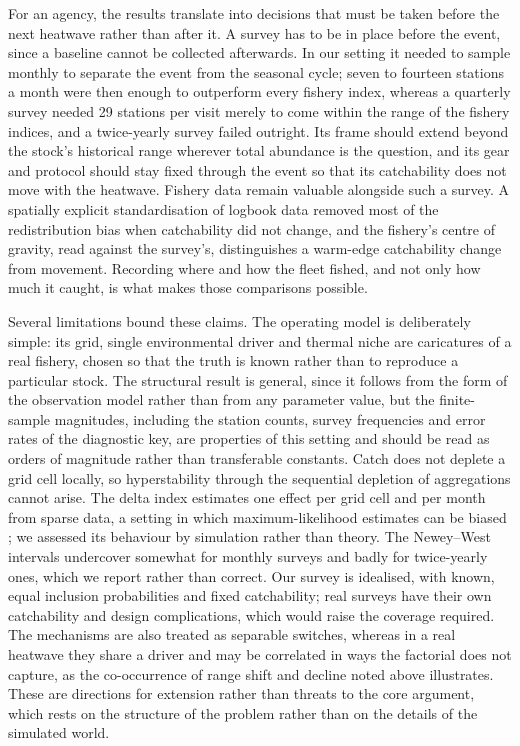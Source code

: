 \documentclass[11pt,a4paper]{article}
\begin{document}
For an agency, the results translate into decisions that must be taken before the next heatwave rather than after it. A survey has to be in place before the event, since a baseline cannot be collected afterwards. In our setting it needed to sample monthly to separate the event from the seasonal cycle; seven to fourteen stations a month were then enough to outperform every fishery index, whereas a quarterly survey needed 29 stations per visit merely to come within the range of the fishery indices, and a twice-yearly survey failed outright. Its frame should extend beyond the stock's historical range wherever total abundance is the question, and its gear and protocol should stay fixed through the event so that its catchability does not move with the heatwave. Fishery data remain valuable alongside such a survey. A spatially explicit standardisation of logbook data removed most of the redistribution bias when catchability did not change, and the fishery's centre of gravity, read against the survey's, distinguishes a warm-edge catchability change from movement. Recording where and how the fleet fished, and not only how much it caught, is what makes those comparisons possible.

Several limitations bound these claims. The operating model is deliberately simple: its grid, single environmental driver and thermal niche are caricatures of a real fishery, chosen so that the truth is known rather than to reproduce a particular stock. The structural result is general, since it follows from the form of the observation model rather than from any parameter value, but the finite-sample magnitudes, including the station counts, survey frequencies and error rates of the diagnostic key, are properties of this setting and should be read as orders of magnitude rather than transferable constants. Catch does not deplete a grid cell locally, so hyperstability through the sequential depletion of aggregations cannot arise. The delta index estimates one effect per grid cell and per month from sparse data, a setting in which maximum-likelihood estimates can be biased \citep[the incidental parameters problem;][]{neyman1948}; we assessed its behaviour by simulation rather than theory. The Newey--West intervals undercover somewhat for monthly surveys and badly for twice-yearly ones, which we report rather than correct. Our survey is idealised, with known, equal inclusion probabilities and fixed catchability; real surveys have their own catchability and design complications, which would raise the coverage required. The mechanisms are also treated as separable switches, whereas in a real heatwave they share a driver and may be correlated in ways the factorial does not capture, as the co-occurrence of range shift and decline noted above illustrates. These are directions for extension rather than threats to the core argument, which rests on the structure of the problem rather than on the details of the simulated world.
\end{document}
